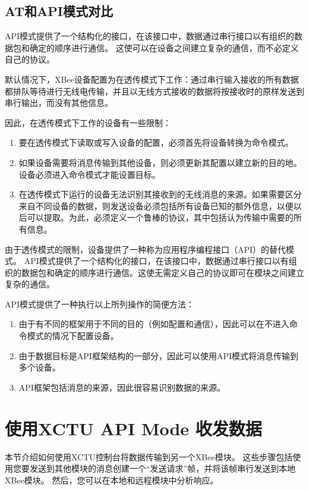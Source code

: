 \subsection{AT和API模式对比}

API模式提供了一个结构化的接口，在该接口中，数据通过串行接口以有组织的数据包和确定的顺序进行通信。 这使可以在设备之间建立复杂的通信，而不必定义自己的协议。

默认情况下，XBee设备配置为在透传模式下工作：通过串行输入接收的所有数据都排队等待进行无线电传输，并且以无线方式接收的数据将按接收时的原样发送到串行输出，而没有其他信息。

因此，在透传模式下工作的设备有一些限制：

\begin{enumerate}
    \item 要在透传模式下读取或写入设备的配置，必须首先将设备转换为命令模式。
    \item 如果设备需要将消息传输到其他设备，则必须更新其配置以建立新的目的地。设备必须进入命令模式才能设置目标。
    \item 在透传模式下运行的设备无法识别其接收到的无线消息的来源。如果需要区分来自不同设备的数据，则发送设备必须包括所有设备已知的额外信息，以便以后可以提取。为此，必须定义一个鲁棒的协议，其中包括认为传输中需要的所有信息。
\end{enumerate}
 
由于透传模式的限制，设备提供了一种称为应用程序编程接口（API）的替代模式。 API模式提供了一个结构化的接口，在该接口中，数据通过串行接口以有组织的数据包和确定的顺序进行通信。这使无需定义自己的协议即可在模块之间建立复杂的通信。


API模式提供了一种执行以上所列操作的简便方法：

\begin{enumerate}
    \item 由于有不同的框架用于不同的目的（例如配置和通信），因此可以在不进入命令模式的情况下配置设备。
    \item 由于数据目标是API框架结构的一部分，因此可以使用API模式将消息传输到多个设备。
    \item API框架包括消息的来源，因此很容易识别数据的来源。    
\end{enumerate}

\section{使用XCTU API Mode 收发数据}

本节介绍如何使用XCTU控制台将数据传输到另一个XBee模块。 这些步骤包括使用您要发送到其他模块的消息创建一个“发送请求”帧，并将该帧串行发送到本地XBee模块。 然后，您可以在本地和远程模块中分析响应。


